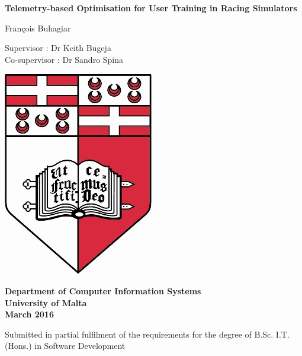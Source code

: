 \documentclass{report}
\begin{document}
\begin{titlepage}
	\begin{center}
		\begin{spacing}{1.5}
			\huge{\textbf{Telemetry-based Optimisation for User Training in Racing Simulators}}
		\end{spacing}
		
		\LARGE{Fran\c{c}ois Buhagiar
		
		Supervisor : Dr Keith Bugeja\\
		Co-supervisor : Dr Sandro Spina}
		
		\vspace{5mm}
		\includegraphics[scale=5]{images/UOM_Logo}
		
		\vfill
		\begin{spacing}{1.5}
			\Large{\textbf{Department of Computer Information Systems\\
				University of Malta\\
				March 2016 }}
		\end{spacing}
		\vspace{10mm}
		\normalsize  Submitted in partial fulfilment of the requirements for the degree of B.Sc. I.T. (Hons.) in Software Development
		\clearpage
	\end{center}
\end{titlepage}


\newpage


\end{document}
